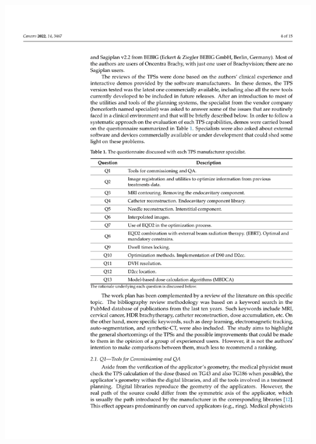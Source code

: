\documentclass[
  a4paper,
]{scrreprt}
\begin{document}
\includegraphics{articulos/cancers/cancers-04.png}
\end{document}
